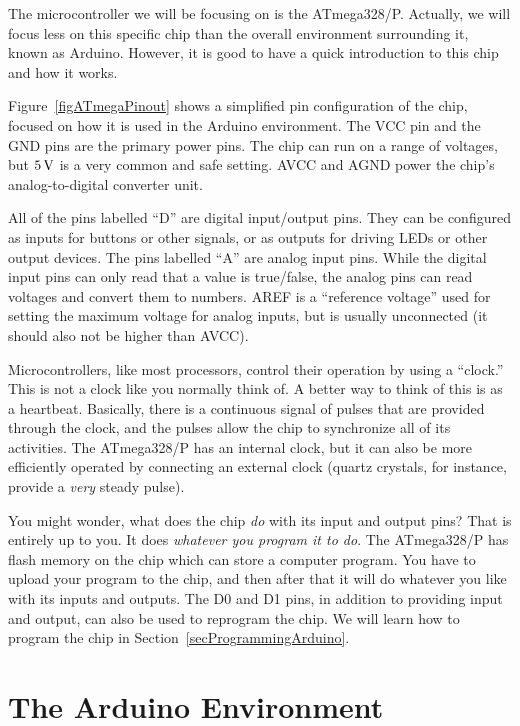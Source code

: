 The microcontroller we will be focusing on is the ATmega328/P.
Actually, we will focus less on this specific chip than the overall environment surrounding it, known as Arduino.
However, it is good to have a quick introduction to this chip and how it works.

Figure~\ref{figATmegaPinout} shows a simplified pin configuration of the chip, focused on how it is used in the Arduino environment.
The VCC pin and the GND pins are the primary power pins.
The chip can run on a range of voltages, but $5\,\si{\volt}$ is a very common and safe setting.
AVCC and AGND power the chip's analog-to-digital converter unit.


All of the pins labelled ``D'' are digital input/output pins.
They can be configured as inputs for buttons or other signals, or as outputs for driving LEDs or other output devices.
The pins labelled ``A'' are analog input pins.
While the digital input pins can only read that a value is true/false, the analog pins can read voltages and convert them to numbers.
AREF is a ``reference voltage'' used for setting the maximum voltage for analog inputs, but is usually unconnected (it should also not be higher than AVCC).

Microcontrollers, like most processors, control their operation by using a ``clock.''  
This is not a clock like you normally think of.
A better way to think of this is as a heartbeat.
Basically, there is a continuous signal of pulses that are provided through the clock, and the pulses allow the chip to synchronize all of its activities.
The ATmega328/P has an internal clock, but it can also be more efficiently operated by connecting an external clock (quartz crystals, for instance, provide a \emph{very} steady pulse).

You might wonder, what does the chip \emph{do} with its input and output pins?
That is entirely up to you.  
It does \emph{whatever you program it to do}.
The ATmega328/P has flash memory on the chip which can store a computer program.
You have to upload your program to the chip, and then after that it will do whatever you like with its inputs and outputs.
The D0 and D1 pins, in addition to providing input and output, can also be used to reprogram the chip.
We will learn how to program the chip in Section~\ref{secProgrammingArduino}.

\section{The Arduino Environment}

